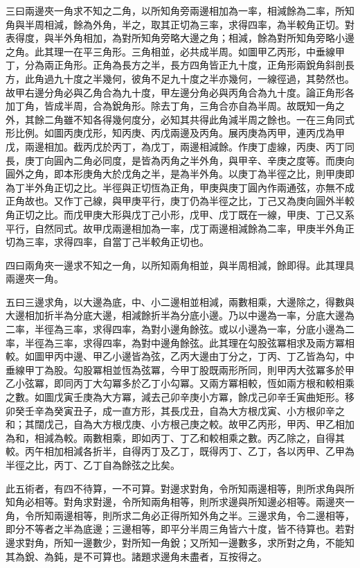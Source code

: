 \begin{pinyinscope}
三曰兩邊夾一角求不知之二角，以所知角旁兩邊相加為一率，相減餘為二率，所知角與半周相減，餘為外角，半之，取其正切為三率，求得四率，為半較角正切。對表得度，與半外角相加，為對所知角旁略大邊之角；相減，餘為對所知角旁略小邊之角。此其理一在平三角形。三角相並，必共成半周。如圖甲乙丙形，中垂線甲丁，分為兩正角形。正角為長方之半，長方四角皆正九十度，正角形兩銳角斜剖長方，此角過九十度之半幾何，彼角不足九十度之半亦幾何，一線徑過，其勢然也。故甲右邊分角必與乙角合為九十度，甲左邊分角必與丙角合為九十度。論正角形各加丁角，皆成半周，合為銳角形。除去丁角，三角合亦自為半周。故既知一角之外，其餘二角雖不知各得幾何度分，必知其共得此角減半周之餘也。一在三角同式形比例。如圖丙庚戊形，知丙庚、丙戊兩邊及丙角。展丙庚為丙甲，連丙戊為甲戊，兩邊相加。截丙戊於丙丁，為戊丁，兩邊相減餘。作庚丁虛線，丙庚、丙丁同長，庚丁向圓內二角必同度，是皆為丙角之半外角，與甲辛、辛庚之度等。而庚向圓外之角，即本形庚角大於戊角之半，是為半外角。以庚丁為半徑之比，則甲庚即為丁半外角正切之比。半徑與正切恆為正角，甲庚與庚丁圓內作兩通弦，亦無不成正角故也。又作丁己線，與甲庚平行，庚丁仍為半徑之比，丁己又為庚向圓外半較角正切之比。而戊甲庚大形與戊丁己小形，戊甲、戊丁既在一線，甲庚、丁己又系平行，自然同式。故甲戊兩邊相加為一率，戊丁兩邊相減餘為二率，甲庚半外角正切為三率，求得四率，自當丁己半較角正切也。

四曰兩角夾一邊求不知之一角，以所知兩角相並，與半周相減，餘即得。此其理具兩邊夾一角。

五曰三邊求角，以大邊為底，中、小二邊相並相減，兩數相乘，大邊除之，得數與大邊相加折半為分底大邊，相減餘折半為分底小邊。乃以中邊為一率，分底大邊為二率，半徑為三率，求得四率，為對小邊角餘弦。或以小邊為一率，分底小邊為二率，半徑為三率，求得四率，為對中邊角餘弦。此其理在勾股弦冪相求及兩方冪相較。如圖甲丙中邊、甲乙小邊皆為弦，乙丙大邊由丁分之，丁丙、丁乙皆為勾，中垂線甲丁為股。勾股冪相並恆為弦冪，今甲丁股既兩形所同，則甲丙大弦冪多於甲乙小弦冪，即同丙丁大勾冪多於乙丁小勾冪。又兩方冪相較，恆如兩方根和較相乘之數。如圖戊寅壬庚為大方冪，減去己卯辛庚小方冪，餘戊己卯辛壬寅曲矩形。移卯癸壬辛為癸寅丑子，成一直方形，其長戊丑，自為大方根戊寅、小方根卯辛之和；其闊戊己，自為大方根戊庚、小方根己庚之較。故甲乙丙形，甲丙、甲乙相加為和，相減為較。兩數相乘，即如丙丁、丁乙和較相乘之數。丙乙除之，自得其較。丙午相加相減各折半，自得丙丁及乙丁，既得丙丁、乙丁，各以丙甲、乙甲為半徑之比，丙丁、乙丁自為餘弦之比矣。

此五術者，有四不待算，一不可算。對邊求對角，令所知兩邊相等，則所求角與所知角必相等。對角求對邊，令所知兩角相等，則所求邊與所知邊必相等。兩邊夾一角，令所知兩邊相等，則所求二角必正得所知外角之半。三邊求角，令二邊相等，即分不等者之半為底邊；三邊相等，即平分半周三角皆六十度，皆不待算也。若對邊求對角，所知一邊數少，對所知一角銳；又所知一邊數多，求所對之角，不能知其為銳、為鈍，是不可算也。諸題求邊角未盡者，互按得之。


\end{pinyinscope}

